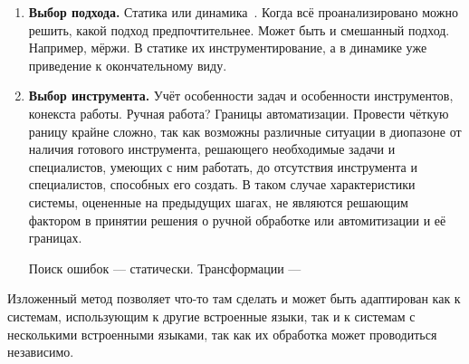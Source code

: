 \begin{enumerate}
  Наличие некоторых связей внешнего и встроенного кода делает невозможным полностью динамический подход, так как без статического анализа не будет получена информация, необходимая для корректного преобразования внешнего кода. Примером такой ситуации может служить трансформация кода хранимой процедуры с динамическими запросами, формирующими запрос \verb|SELECT| из T-SQL в PL-SQL. При этом результат данного запроса должен быть результатом процедуры. В T-SQL вне зависимости от типа сформированного запроса его выполнение производится с помощью команды \verb|EXECUTE| и результат выполнения автоматически возвращается в качестве результата процедуры, а в PL-SQL для того, чтобы получить результат выполнения запроса и вернуть его наружу из процедуры необходимо использовать конструкцию \verb|EXECUTE IMMEDIATE ... INTO out_var|~\footnote{\url{http://docs.oracle.com/cd/B12037_01/appdev.101/b10807/13_elems017.htm}}, при этом \verb|out_var| должна быть объявлена аргументом процедуры с модификатором \verb|OUT|~\footnote{\url{http://docs.oracle.com/cd/A97630_01/appdev.920/a96624/08_subs.htm\#752}}. То есть в данном случае без статического анализа динамически формируемого кода невозможно корректно преобразовать внешний код.

  Отдельно нужно проверить наличие конструкций, которые заведомо усложняют автоматическую обработку системы. Примером такой конструкции может служить \verb|MERGE| в PL-SQL, проекция которого в другие языки может потребовать существенных усилий.
  
  \item \textbf{Выбор подхода.} Статика или динамика~\cite{OpenSystem}. Когда всё проанализировано можно решить, какой подход предпочтительнее. Может быть и смешанный подход. Например, мёржи. В статике их инструментирование, а в динамике уже приведение к окончательному виду.
  
  \item \textbf{Выбор инструмента.} Учёт особенности задач и особенности инструментов, конекста работы. Ручная работа? Границы автоматизации. Провести чёткую раницу крайне сложно, так как возможны различные ситуации в диопазоне от наличия готового инструмента, решающего необходимые задачи и специалистов, умеющих с ним работать, до отсутствия инструмента и специалистов, способных его создать. В таком случае характеристики системы, оцененные на предыдущих шагах, не являются решающим фактором в принятии решения о ручной обработке или автомитизации и её границах.
  
  Поиск ошибок --- статически.
  Трансформации ---
  
\end{enumerate}

Изложенный метод позволяет что-то там сделать и может быть адаптирован как к системам, использующим к другие встроенные языки, так и к системам с несколькими встроенными языками, так как их обработка может проводиться независимо.



\clearpage
